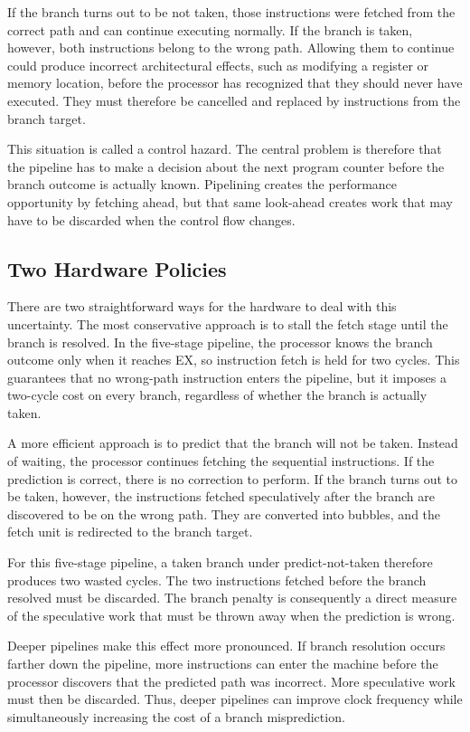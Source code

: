 \documentclass[11pt,a4paper]{report}
\begin{document}
If the branch turns out to be not taken, those instructions were fetched from the correct path and can continue executing normally. If the branch is taken, however, both instructions belong to the wrong path. Allowing them to continue could produce incorrect architectural effects, such as modifying a register or memory location, before the processor has recognized that they should never have executed. They must therefore be cancelled and replaced by instructions from the branch target.

This situation is called a control hazard. The central problem is therefore that the pipeline has to make a decision about the next program counter before the branch outcome is actually known. Pipelining creates the performance opportunity by fetching ahead, but that same look-ahead creates work that may have to be discarded when the control flow changes.~\cite{sarangi}

\subsection{Two Hardware Policies}

There are two straightforward ways for the hardware to deal with this uncertainty. The most conservative approach is to stall the fetch stage until the branch is resolved. In the five-stage pipeline, the processor knows the branch outcome only when it reaches EX, so instruction fetch is held for two cycles. This guarantees that no wrong-path instruction enters the pipeline, but it imposes a two-cycle cost on every branch, regardless of whether the branch is actually taken.

A more efficient approach is to predict that the branch will not be taken. Instead of waiting, the processor continues fetching the sequential instructions. If the prediction is correct, there is no correction to perform. If the branch turns out to be taken, however, the instructions fetched speculatively after the branch are discovered to be on the wrong path. They are converted into bubbles, and the fetch unit is redirected to the branch target.

For this five-stage pipeline, a taken branch under predict-not-taken therefore produces two wasted cycles. The two instructions fetched before the branch resolved must be discarded. The branch penalty is consequently a direct measure of the speculative work that must be thrown away when the prediction is wrong.~\cite{sarangi}

Deeper pipelines make this effect more pronounced. If branch resolution occurs farther down the pipeline, more instructions can enter the machine before the processor discovers that the predicted path was incorrect. More speculative work must then be discarded. Thus, deeper pipelines can improve clock frequency while simultaneously increasing the cost of a branch misprediction.
\end{document}
